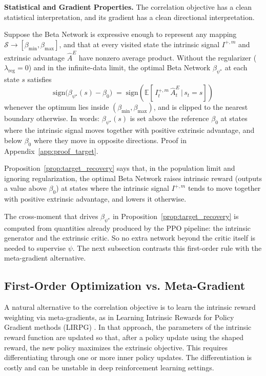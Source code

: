 \textbf{Statistical and Gradient Properties.} The correlation objective has a clean statistical interpretation, and its gradient has a clean directional interpretation.

\begin{proposition}
\label{prop:target_recovery}
Suppose the Beta Network is expressive enough to represent any mapping $\mathcal{S} \to [\beta_\text{min}, \beta_\text{max}]$, and that at every visited state the intrinsic signal $I^{+,m}$ and extrinsic advantage $\hat A^{E}$ have nonzero average product. Without the regularizer ($\lambda_\text{reg} = 0$) and in the infinite-data limit, the optimal Beta Network $\beta_{\psi^\star}$ at each state $s$ satisfies
\begin{equation*}
\mathrm{sign}\bigl( \beta_{\psi^\star}(s) - \beta_0 \bigr)
\;=\;
\mathrm{sign}\!\left( \mathbb{E}\!\left[\, I_t^{+,m}\,\hat A_t^{E} \,\big|\, s_t = s \right] \right)
\end{equation*}
whenever the optimum lies inside $(\beta_\text{min}, \beta_\text{max})$, and is clipped to the nearest boundary otherwise. In words: $\beta_{\psi^\star}(s)$ is set above the reference $\beta_0$ at states where the intrinsic signal moves together with positive extrinsic advantage, and below $\beta_0$ where they move in opposite directions.
Proof in Appendix~\ref{app:proof_target}.
\end{proposition}

Proposition~\ref{prop:target_recovery} says that, in the population limit and ignoring regularization, the optimal Beta Network raises intrinsic reward (outputs a value above $\beta_0$) at states where the intrinsic signal $I^{+,m}$ tends to move together with positive extrinsic advantage, and lowers it otherwise.

The cross-moment that drives $\beta_{\psi^\star}$ in Proposition~\ref{prop:target_recovery} is computed from quantities already produced by the PPO pipeline: the intrinsic generator and the extrinsic critic. So no extra network beyond the critic itself is needed to supervise $\psi$. The next subsection contrasts this first-order rule with the meta-gradient alternative.

\subsection{First-Order Optimization vs. Meta-Gradient}
\label{sec:first_order}

A natural alternative to the correlation objective is to learn the intrinsic reward weighting via meta-gradients, as in Learning Intrinsic Rewards for Policy Gradient methods (LIRPG) \cite{zheng2018lirpg}. In that approach, the parameters of the intrinsic reward function are updated so that, after a policy update using the shaped reward, the new policy maximizes the extrinsic objective. This requires differentiating through one or more inner policy updates. The differentiation is costly and can be unstable in deep reinforcement learning settings.

